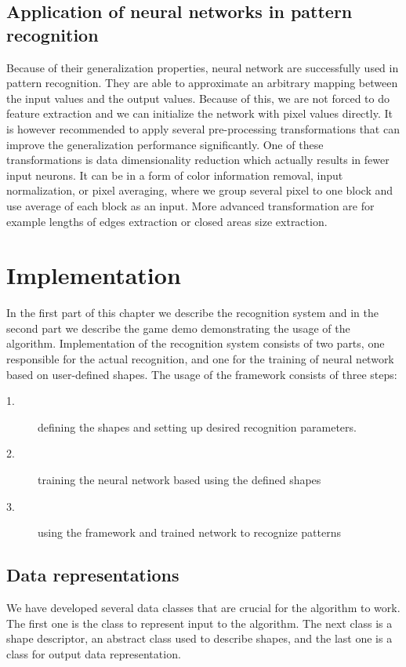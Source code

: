 \section{Application of neural networks in pattern recognition}
\cite{Bishop} Because of their generalization properties, neural network are successfully used in pattern recognition. They are able to approximate an arbitrary mapping between the input values and the output values. Because of this, we are not forced to do feature extraction and we can initialize the network with pixel values directly. It is however recommended to apply several pre-processing transformations that can improve the generalization performance significantly. One of these transformations is data dimensionality reduction which actually results in fewer input neurons. It can be in a form of color information removal, input normalization, or pixel averaging, where we group several pixel to one block and use average of each block as an input. More advanced transformation are for example lengths of edges extraction or closed areas size extraction. 


\chapter{Implementation}
In the first part of this chapter we describe the recognition system and in the second part we describe the game demo demonstrating the usage of the algorithm. Implementation of the recognition system consists of two parts, one responsible for the actual recognition, and one for the training of neural network based on user-defined shapes. The usage of the framework consists of three steps:
\begin{description}
\item[1.] defining the shapes and setting up desired recognition parameters.
\item[2.] training the neural network based using the defined shapes
\item[3.] using the framework and trained network to recognize patterns
\end{description}

\section{Data representations}
We have developed several data classes that are crucial for the algorithm to work. The first one is the class to represent input to the algorithm. The next class is a shape descriptor, an abstract class used to describe shapes, and the last one is a class for output data representation.

